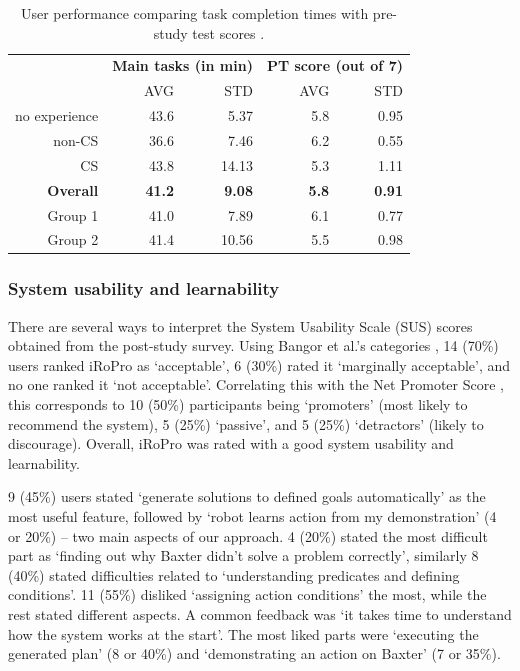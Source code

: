 \begin{table}
	\centering
	\caption{User performance comparing task completion times with pre-study test scores \cite{liang2019d}.}
	\label{table:performance}
	\begin{center}
		\begin{tabular}{r|rr|rr}
			& \multicolumn{2}{c}{\textbf{Main tasks (in min)}} & \multicolumn{2}{c}{\textbf{PT score (out of 7)}} \\
			& AVG                & STD                & AVG                   & STD                   \\ \hline
			no experience  & 43.6               & 5.37               & 5.8                   & 0.95                  \\
			non-CS  & 36.6               & 7.46               & 6.2                   & 0.55                  \\
			CS      & 43.8               & 14.13              & 5.3                   & 1.11                 \\ \hline
			\textbf{Overall} & \textbf{41.2}              & \textbf{9.08}               & \textbf{5.8}                   & \textbf{0.91}                  \\ \hline
			Group 1 & 41.0               & 7.89               & 6.1                   & 0.77                  \\
			Group 2 & 41.4               & 10.56              & 5.5                   & 0.98                 
		\end{tabular}
	\end{center}
\end{table}

\subsubsection*{\textbf{System usability and learnability}} 
There are several ways to interpret the System Usability Scale (SUS) scores \cite{brooke2013sus} obtained from the post-study survey. 
Using Bangor et al.'s categories \cite{bangor2008suseval}, 14 (70\%) users ranked iRoPro as `acceptable', 6 (30\%) rated it `marginally acceptable', and no one ranked it `not acceptable'.
Correlating this with the Net Promoter Score \cite{nps}, this corresponds to 10 (50\%) participants being `promoters' (most likely to recommend the system), 5 (25\%) `passive', and 5 (25\%) `detractors' (likely to discourage).
Overall, iRoPro was rated with a good system usability and learnability.

9 (45\%) users stated `generate solutions to defined goals automatically' as the most useful feature, followed by `robot learns action from my demonstration' (4 or 20\%) -- two main aspects of our approach.
4 (20\%) stated the most difficult part as `finding out why Baxter didn't solve a problem correctly', similarly 8 (40\%) stated difficulties related to `understanding predicates and defining conditions'. 
11 (55\%) disliked `assigning action conditions' the most, while the rest stated different aspects.
A common feedback was `it takes time to understand how the system works at the start'.
The most liked parts were `executing the generated plan' (8 or 40\%) and `demonstrating an action on Baxter' (7 or 35\%).

